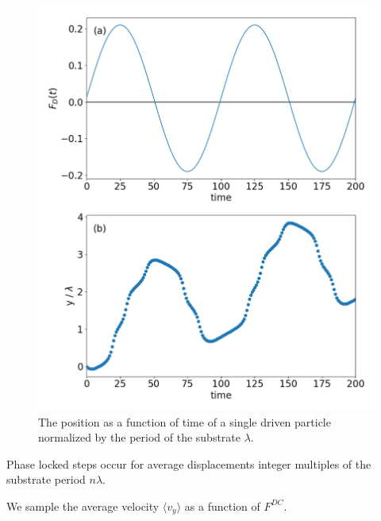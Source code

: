 \documentclass[twocolumn,preprintnumbers,amsmath,amssymb,aps,prx]{revtex4}
\begin{document}
\begin{center}
\begin{figure}[h!]
\centering
\includegraphics[width=\columnwidth]{position.png}
\caption{The position as a function of time of a single driven particle
  normalized by the period of the substrate $\lambda$.
  }
\label{fig:0}
\end{figure}
\end{center}

Phase locked steps occur for average displacements integer
multiples of the substrate period $n\lambda$.

We sample the average velocity $\langle v_y \rangle $
as a function of $F^{DC}$.
\end{document}
